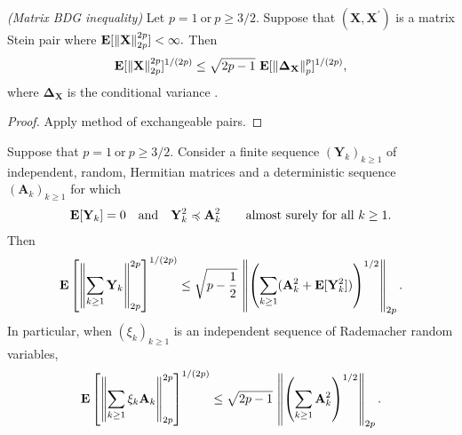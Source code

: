 \begin{theorem}
  \emph{(Matrix BDG inequality)}
  Let
  $
    p = 1
    \ 
    \text{or}\ 
    p \ge 3/2
    .
  $
  Suppose that 
  $
  (
    \mathbf{X}
   , 
   \mathbf{X}^{'}
  )
  $
  is a matrix Stein pair where
  $
   \mathbf{E}
   [ 
    \left\lVert\mathbf{X}\right\rVert
    _{2p}^{2p}
   ]
   <
   \infty
   .
  $
  Then
  \begin{gather}
   \E
   [ 
    \norm{\mathbf{X}}
    _{2p}^{2p}
   ]
   ^{1/(2p)}
   \le
   \sqrt{2p - 1}
   \ 
   \E
   [ 
    \norm{\mathbf{\Delta_X}}
    _{p}^{p}
   ]
   ^{1/(2p)}
   ,
  \end{gather}
  where 
  $
    \mathbf{\Delta_X}
  $
  is the conditional variance
  .
\end{theorem}
\begin{proof}
  \emph{\cite[§7.3]{Mackey2014}}
  Apply method of exchangeable pairs.
\end{proof}




\begin{ftheorem}
  \emph{\cite[Corollary~7.3]{Mackey2014}}
  Suppose that
  $
    p = 1
    \ 
    \text{or}\ 
    p \ge 3/2
    .
  $
  Consider a finite sequence
  $
    (\mathbf{Y}_k)_{k\ge 1}
  $
  of independent, random, Hermitian matrices 
  and a deterministic sequence
  $
    (\mathbf{A}_k)_{k\ge 1}
  $
  for which
  \begin{gather}
    \E[\mathbf{Y}_k]
    =
    0
    \quad 
    \text{and}
    \quad
    \mathbf{Y}_k^2
    \preccurlyeq
    \mathbf{A}_k^2
    \qquad
    \text{almost surely for all}\ 
    k \ge 1.
  \end{gather}
  Then
  \begin{gather}
      \mathbf{E}
      \left[
        \left\lVert
          \sum_{k\ge 1}
            \mathbf{Y}_k
        \right\rVert
        _{2p}
        ^{2p}
      \right]
      ^{1/(2p)}
      \le
      \sqrt{
        p - \frac{1}{2}
      }
      \,
      \left\lVert
        \left( 
          \sum_{k\ge 1}
          (
            \mathbf{A}_k^2
            + 
            \mathbf{E}[
              \mathbf{Y}_k^2
            ]
          )
        \right)
        ^{1/2}
        \right\rVert
      _{2p}
      .
  \end{gather}
  In particular, when 
  $
    (\xi_k)_{k\ge 1}
  $
  is an independent sequence of Rademacher random variables,
  \begin{gather}
      \mathbf{E}
      \left[
        \left\lVert
          \sum_{k\ge 1}
            \xi_k
            \mathbf{A}_k
        \right\rVert
        _{2p}
        ^{2p}
      \right]
      ^{1/(2p)}
      \le
      \sqrt{
        2p - 1
        }
      \,
      \left\lVert
        \left( 
          \sum_{k\ge 1}
            \mathbf{A}_k^2
        \right)
        ^{1/2}
        \right\rVert
      _{2p}
      .
  \end{gather}
\end{ftheorem}
